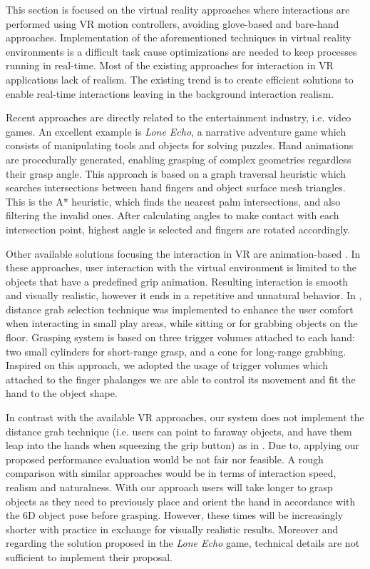This section is focused on the virtual reality approaches where interactions are performed using VR motion controllers, avoiding glove-based and bare-hand approaches. Implementation of the aforementioned techniques in virtual reality environments is a difficult task cause optimizations are needed to keep processes running in real-time. Most of the existing approaches for interaction in VR applications lack of realism. The existing trend is to create efficient solutions to enable real-time interactions leaving in the background interaction realism. 

Recent approaches are directly related to the entertainment industry, i.e. video games. An excellent example is \emph{Lone Echo}, a narrative adventure game which consists of manipulating tools and objects for solving puzzles. Hand animations are procedurally generated, enabling grasping of complex geometries regardless their grasp angle. This approach \cite{copenhaver2017} is based on a graph traversal heuristic which searches intersections between hand fingers and object surface mesh triangles. This is the A* heuristic, which finds the nearest palm intersections, and also filtering the invalid ones. After calculating angles to make contact with each intersection point, highest angle is selected and fingers are rotated accordingly.

Other available solutions focusing the interaction in VR are animation-based \cite{oculusDistanceGrab2017} \cite{oculusFirstExperience} \cite{vrtemplate2016}. In these approaches, user interaction with the virtual environment is limited to the objects that have a predefined grip animation. Resulting interaction is smooth and visually realistic, however it ends in a repetitive and unnatural behavior. In \cite{oculusDistanceGrab2017}, distance grab selection technique was implemented to enhance the user comfort when interacting in small play areas, while sitting or for grabbing objects on the floor. Grasping system is based on three trigger volumes attached to each hand: two small cylinders for short-range grasp, and a cone for long-range grabbing. Inspired on this approach, we adopted the usage of trigger volumes which attached to the finger phalanges we are able to control its movement and fit the hand to the object shape. 

In contrast with the available VR approaches, our system does not implement the distance grab technique (i.e. users can point to faraway objects, and have them leap into the hands when squeezing the grip button) as in \cite{oculusDistanceGrab2017}. Due to, applying our proposed performance evaluation would be not fair nor feasible. A rough comparison with similar approaches would be in terms of interaction speed, realism and naturalness. With our approach users will take longer to grasp objects as they need to previously place and orient the hand in accordance with the 6D object pose before grasping. However, these times will be increasingly shorter with practice in exchange for visually realistic results. Moreover and regarding the solution proposed in the \emph{Lone Echo} game, technical details are not sufficient to implement their proposal.


